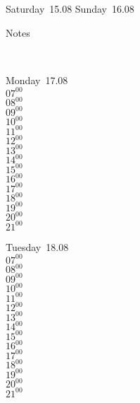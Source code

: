 \documentclass[11pt,a4paper]{book}\usepackage[]{graphicx}\usepackage[]{color}
\begin{document}
{{{{{{{\begin{tcolorbox}
\end{tcolorbox} 
\begin{tcolorbox}[height=(\textheight-10mm)/6]
Saturday~15.08
\tcblower
Sunday~16.08
\end{tcolorbox} %
\begin{tcolorbox}[height=(\textheight-10mm)/6,sidebyside=false]
Notes
\end{tcolorbox}
\clearpage
\vspace{2 mm}\\
\begin{tcolorbox}
Monday~17.08\\
{ 
  $07^{00}$\\
$08^{00}$\\
$09^{00}$\\
$10^{00}$\\
$11^{00}$\\
$12^{00}$\\
$13^{00}$\\
$14^{00}$\\
$15^{00}$\\
$16^{00}$\\
$17^{00}$\\
$18^{00}$\\
$19^{00}$\\
$20^{00}$\\
$21^{00}$}\\

\end{tcolorbox}
\begin{tcolorbox}
Tuesday~18.08\\
{ 
  $07^{00}$\\
$08^{00}$\\
$09^{00}$\\
$10^{00}$\\
$11^{00}$\\
$12^{00}$\\
$13^{00}$\\
$14^{00}$\\
$15^{00}$\\
$16^{00}$\\
$17^{00}$\\
$18^{00}$\\
$19^{00}$\\
$20^{00}$\\
$21^{00}$}\\


\end{tcolorbox}}}}}}}}
\end{document}
